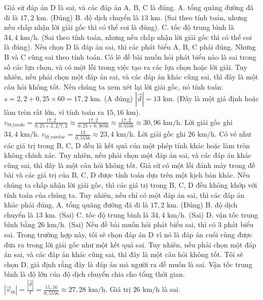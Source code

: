 \begin{ex}
{Giả sử đáp án D là sai, và các đáp án A, B, C là đúng.
A. tổng quãng đường đã đi là $17,2 \text{ km}$. (Đúng)
B. độ dịch chuyển là $13 \text{ km}$. (Sai theo tính toán, nhưng nếu chấp nhận lời giải gốc thì có thể coi là đúng).
C. tốc độ trung bình là $34,4 \text{ km/h}$. (Sai theo tính toán, nhưng nếu chấp nhận lời giải gốc thì có thể coi là đúng).
Nếu chọn D là đáp án sai, thì các phát biểu A, B, C phải đúng. Nhưng B và C cũng sai theo tính toán.
Có lẽ đề bài muốn hỏi phát biểu nào là sai trong số các lựa chọn, và có một lỗi trong việc tạo ra các lựa chọn hoặc lời giải.
Tuy nhiên, nếu phải chọn một đáp án sai, và các đáp án khác cũng sai, thì đây là một câu hỏi không tốt.
Nếu chúng ta xem xét lại lời giải gốc, nó tính toán:
$s = 2,2 + 0,25 \times 60 = 17,2 \text{ km}$. (A đúng)
$|\vec{d}| = 13 \text{ km}$. (Đây là một giả định hoặc làm tròn rất lớn, vì tính toán ra $15,16 \text{ km}$).
$v_{tb\_tocdo} = \frac{17,2}{0,25 + 2,2/7,2} \approx \frac{17,2}{0,25 + 0,3056} \approx \frac{17,2}{0,5556} \approx 30,96 \text{ km/h}$. Lời giải gốc ghi $34,4 \text{ km/h}$.
$v_{tb\_vantoc} = \frac{13}{0,5556} \approx 23,4 \text{ km/h}$. Lời giải gốc ghi $26 \text{ km/h}$.
Có vẻ như các giá trị trong B, C, D đều là kết quả của một phép tính khác hoặc làm tròn không chính xác.
Tuy nhiên, nếu phải chọn một đáp án sai, và các đáp án khác cũng sai, thì đây là một câu hỏi không tốt.
Giả sử có một lỗi đánh máy trong đề bài và các giá trị của B, C, D được tính toán dựa trên một kịch bản khác.
Nếu chúng ta chấp nhận lời giải gốc, thì các giá trị trong B, C, D đều không khớp với tính toán của chúng ta.
Tuy nhiên, nếu chỉ có một đáp án sai, thì các đáp án khác phải đúng.
A. tổng quãng đường đã đi là $17,2 \text{ km}$. (Đúng)
B. độ dịch chuyển là $13 \text{ km}$. (Sai)
C. tốc độ trung bình là $34,4 \text{ km/h}$. (Sai)
D. vận tốc trung bình bằng $26 \text{ km/h}$. (Sai)
Nếu đề bài muốn hỏi phát biểu sai, thì có 3 phát biểu sai.
Trong trường hợp này, tôi sẽ chọn đáp án D vì nó là đáp án cuối cùng được đưa ra trong lời giải gốc như một kết quả sai.
Tuy nhiên, nếu phải chọn một đáp án sai, và các đáp án khác cũng sai, thì đây là một câu hỏi không tốt.
Tôi sẽ chọn D, giả định rằng đây là đáp án mà người ra đề muốn là sai.
Vận tốc trung bình là độ lớn của độ dịch chuyển chia cho tổng thời gian.
$|\vec{v}_{tb}| = \frac{|\vec{d}|}{t} = \frac{15,16}{0,5556} \approx 27,28 \text{ km/h}$.
Giá trị $26 \text{ km/h}$ là sai.
}
\end{ex}

